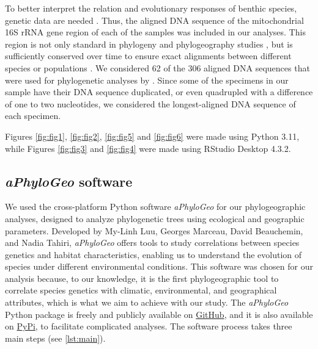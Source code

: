 To better interpret the relation and evolutionary responses of benthic species, genetic data are needed \citep{wilson_speciation_1987, uhlir_adding_2021}. Thus, the aligned DNA sequence of the mitochondrial 16S rRNA gene region of each of the samples was included in our analyses. This region is not only standard in phylogeny and phylogeography studies \citep{hugenholtz1998impact}, but is sufficiently conserved over time to ensure exact alignments between different species or populations \citep{saccone1999evolutionary}. We considered 62 of the 306 aligned DNA sequences that were used for phylogenetic analyses by \citep{uhlir_adding_2021}. Since some of the specimens in our sample have their DNA sequence duplicated, or even quadrupled with a difference of one to two nucleotides, we considered the longest-aligned DNA sequence of each specimen. 

Figures \ref{fig:fig1}, \ref{fig:fig2}, \ref{fig:fig5} and \ref{fig:fig6} were made using Python 3.11, while Figures \ref{fig:fig3} and \ref{fig:fig4} were made using RStudio Desktop 4.3.2.

\subsection{\textit{aPhyloGeo} software}

We used the cross-platform Python software \textit{aPhyloGeo} for our phylogeographic analyses, designed to analyze phylogenetic trees using ecological and geographic parameters. Developed by My-Linh Luu, Georges Marceau, David Beauchemin, and Nadia Tahiri, \textit{aPhyloGeo} offers tools to study correlations between species genetics and habitat characteristics, enabling us to understand the evolution of species under different environmental conditions. This software was chosen for our analysis because, to our knowledge, it is the first phylogeographic tool to correlate species genetics with climatic, environmental, and geographical attributes, which is what we aim to achieve with our study. The \textit{aPhyloGeo} Python package is freely and publicly available on \href{https://github.com/tahiri-lab/aPhyloGeo}{GitHub}, and it is also available on \href{https://pypi.org/project/aphylogeo/}{PyPi}, to facilitate complicated analyses. The software process takes three main steps (see \autoref{lst:main}).


